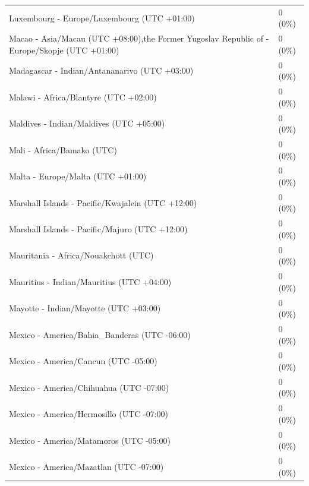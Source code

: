 \begin{appendix}
\begin{table}
{\begin{tabular}[t]{ll}
\hspace{1em}Luxembourg - Europe/Luxembourg (UTC +01:00) & 0 (0\%)\\
\addlinespace
\hspace{1em}Macao - Asia/Macau (UTC +08:00),the Former Yugoslav Republic of - Europe/Skopje (UTC +01:00) & 0 (0\%)\\
\hspace{1em}Madagascar - Indian/Antananarivo (UTC +03:00) & 0 (0\%)\\
\hspace{1em}Malawi - Africa/Blantyre (UTC +02:00) & 0 (0\%)\\
\hspace{1em}Maldives - Indian/Maldives (UTC +05:00) & 0 (0\%)\\
\hspace{1em}Mali - Africa/Bamako (UTC) & 0 (0\%)\\
\addlinespace
\hspace{1em}Malta - Europe/Malta (UTC +01:00) & 0 (0\%)\\
\hspace{1em}Marshall Islands - Pacific/Kwajalein (UTC +12:00) & 0 (0\%)\\
\hspace{1em}Marshall Islands - Pacific/Majuro (UTC +12:00) & 0 (0\%)\\
\hspace{1em}Mauritania - Africa/Nouakchott (UTC) & 0 (0\%)\\
\hspace{1em}Mauritius - Indian/Mauritius (UTC +04:00) & 0 (0\%)\\
\addlinespace
\hspace{1em}Mayotte - Indian/Mayotte (UTC +03:00) & 0 (0\%)\\
\hspace{1em}Mexico - America/Bahia\_Banderas (UTC -06:00) & 0 (0\%)\\
\hspace{1em}Mexico - America/Cancun (UTC -05:00) & 0 (0\%)\\
\hspace{1em}Mexico - America/Chihuahua (UTC -07:00) & 0 (0\%)\\
\hspace{1em}Mexico - America/Hermosillo (UTC -07:00) & 0 (0\%)\\
\addlinespace
\hspace{1em}Mexico - America/Matamoros (UTC -05:00) & 0 (0\%)\\
\hspace{1em}Mexico - America/Mazatlan (UTC -07:00) & 0 (0\%)\\

\end{tabular}}
\end{table}
\end{appendix}
